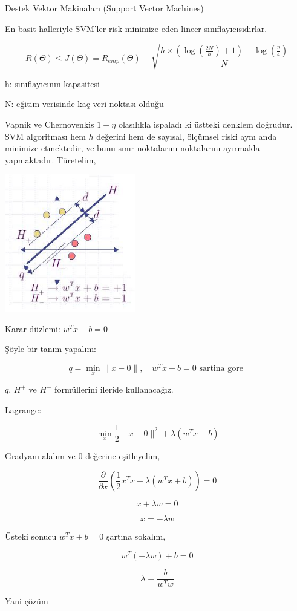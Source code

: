 \documentclass[12pt,fleqn]{article}\usepackage{../../common}
\begin{document}
Destek Vektor Makinaları (Support Vector Machines)

En basit halleriyle SVM'ler risk minimize eden lineer sınıflayıcısıdırlar. 

$$
R(\Theta) \leq J(\Theta) = R_{emp}(\Theta) +
\sqrt{ \frac{h \times (\log(\frac{2N}{h}) + 1) - \log(\frac{\eta}{4})}{N}}
$$

h: sınıflayıcının kapasitesi 

N: eğitim verisinde kaç veri noktası olduğu

Vapnik ve Chernovenkis $1-\eta$ olasılıkla ispaladı ki üstteki denklem doğrudur. 
SVM algoritması hem $h$ değerini hem de sayısal, ölçümsel riski aynı
anda minimize etmektedir, ve bunu sınır noktalarını noktalarını
ayırmakla yapmaktadır. Türetelim, 

\includegraphics[height=6cm]{svm-planes.png}

Karar düzlemi: $w^{T}x + b=0$ 

Şöyle bir tanım yapalım:

$$
q = \min_{x}\big\|x - 0\big\|, \quad w^T x+b=0 \textrm { sartina gore }
$$

$q$, $H^{+}$ ve $H^{-}$ formüllerini ileride kullanacağız.

Lagrange:

$$
\min_{x}\frac{1}{2} \big\|x - 0\big\|^2+\lambda(w^{T}x+b)
$$

Gradyanı alalım ve 0 değerine eşitleyelim,

$$
\frac{\partial}{\partial x} ( \frac{1}{2} x^T x + \lambda( w^T x + b ) ) = 0
$$

$$ x + \lambda w = 0 $$

$$ x = -\lambda w $$

Üsteki sonucu $w^T x+b=0$ şartına sokalım,

$$ w^T(-\lambda w) + b = 0 $$

$$ \lambda = \frac{b}{w^Tw} $$

Yani çözüm
\end{document}
